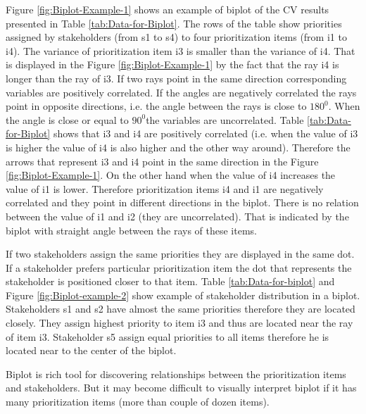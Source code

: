 Figure \ref{fig:Biplot-Example-1} shows an example of biplot of the
CV results presented in Table \ref{tab:Data-for-Biplot}. The rows
of the table show priorities assigned by stakeholders (from s1 to
s4) to four prioritization items (from i1 to i4). The variance of
prioritization item i3 is smaller than the variance of i4. That is
displayed in the Figure \ref{fig:Biplot-Example-1} by the fact that
the ray i4 is longer than the ray of i3. If two rays point in the
same direction corresponding variables are positively correlated.
If the angles are negatively correlated the rays point in opposite
directions, i.e. the angle between the rays is close to $180^{0}$.
When the angle is close or equal to $90^{0}$the variables are uncorrelated.
Table \ref{tab:Data-for-Biplot} shows that i3 and i4 are positively
correlated (i.e. when the value of i3 is higher the value of i4 is
also higher and the other way around). Therefore the arrows that represent
i3 and i4 point in the same direction in the Figure \ref{fig:Biplot-Example-1}.
On the other hand when the value of i4 increases the value of i1 is
lower. Therefore prioritization items i4 and i1 are negatively correlated
and they point in different directions in the biplot. There is no
relation between the value of i1 and i2 (they are uncorrelated). That
is indicated by the biplot with straight angle between the rays of
these items.

If two stakeholders assign the same priorities they are displayed
in the same dot. If a stakeholder prefers particular prioritization
item the dot that represents the stakeholder is positioned closer
to that item. Table \ref{tab:Data-for-biplot} and Figure \ref{fig:Biplot-example-2}
show example of stakeholder distribution in a biplot. Stakeholders
s1 and s2 have almost the same priorities therefore they are located
closely. They assign highest priority to item i3 and thus are located
near the ray of item i3. Stakeholder s5 assign equal priorities to
all items therefore he is located near to the center of the biplot.

Biplot is rich tool for discovering relationships between the prioritization
items and stakeholders. But it may become difficult to visually interpret
biplot if it has many prioritization items (more than couple of dozen
items).

